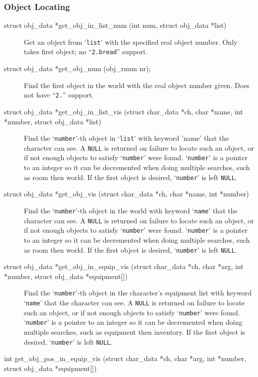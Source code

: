 \documentclass[11pt]{article}
\begin{document}
\subsubsection{Object Locating}
\begin{description}
\item[struct obj\_data *get\_obj\_in\_list\_num (int num, struct obj\_data *list)]
Get an object from `\texttt{list}' with the specified real object number. Only takes first object; no ``\texttt{2.bread}'' support.
\item[struct obj\_data *get\_obj\_num (obj\_rnum nr);]
Find the first object in the world with the real object number given.  Does not have ``\texttt{2.}'' support.
\item[struct obj\_data *get\_obj\_in\_list\_vis (struct char\_data *ch, char *name, int *number, struct obj\_data *list)]
Find the `\texttt{number}'-th object in `\texttt{list}' with keyword 'name' that the character can see.  A \texttt{NULL} is returned on failure to locate such an object, or if not enough objects to satisfy `\texttt{number}' were found. `\texttt{number}' is a pointer to an integer so it can be decremented when doing multiple searches, such as room then world.  If the first object is desired, `\texttt{number}' is left \texttt{NULL}.
\item[struct obj\_data *get\_obj\_vis (struct char\_data *ch, char *name, int *number)]
Find the `\texttt{number}'-th object in the world with keyword `\texttt{name}' that
the character can see.  A \texttt{NULL} is returned on failure to locate such an object, or if not enough objects to satisfy `\texttt{number}' were found. `\texttt{number}' is a pointer to an integer so it can be decremented when doing multiple searches, such as room then world.  If the
first object is desired, `\texttt{number}' is left \texttt{NULL}.
\item[struct obj\_data *get\_obj\_in\_equip\_vis (struct char\_data *ch, char *arg, int *number, struct obj\_data *equipment[{]})]
Find the `\texttt{number}'-th object in the character's equipment list with keyword `\texttt{name}' that the character can see.  A \texttt{NULL} is returned on failure to locate such an object, or if not enough objects to satisfy `\texttt{number}' were found. `\texttt{number}' is a pointer to an integer so it can be decremented when doing multiple searches, such as equipment then inventory. If the first object is desired, `\texttt{number}' is left \texttt{NULL}.
\item[int get\_obj\_pos\_in\_equip\_vis (struct char\_data *ch, char *arg, int *number, struct obj\_data *equipment[{]})]

\end{description}
\end{document}
